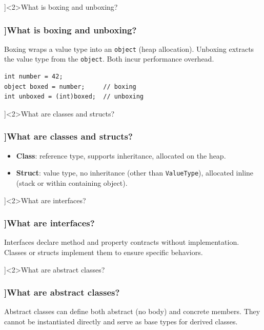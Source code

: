 \QuestionSlide[\CategoryBadge[MemoryColor!20]{Types \& Memory}]<2>{What is boxing and unboxing?}
\begin{frame}[fragile]
  \frametitle{\AnswerTitle[\CategoryBadge[MemoryColor!20]{Types \& Memory}]{What is boxing and unboxing?}}

  {\footnotesize
    Boxing wraps a value type into an \texttt{object} (heap allocation). Unboxing extracts the value type from the \texttt{object}. Both incur performance overhead.
  }

  \begin{verbatim}
int number = 42;
object boxed = number;     // boxing
int unboxed = (int)boxed;  // unboxing
  \end{verbatim}
\end{frame}

\QuestionSlide[\CategoryBadge[OOPColor!20]{Language Basics}]<2>{What are classes and structs?}
\begin{frame}[fragile]
  \frametitle{\AnswerTitle[\CategoryBadge[OOPColor!20]{Language Basics}]{What are classes and structs?}}

  {\footnotesize
    \begin{itemize}
      \item \textbf{Class}: reference type, supports inheritance, allocated on the heap.
      \item \textbf{Struct}: value type, no inheritance (other than \texttt{ValueType}), allocated inline (stack or within containing object).
    \end{itemize}
  }
\end{frame}

\QuestionSlide[\CategoryBadge[OOPColor!20]{Language Basics}]<2>{What are interfaces?}
\begin{frame}[fragile]
  \frametitle{\AnswerTitle[\CategoryBadge[OOPColor!20]{Language Basics}]{What are interfaces?}}

  {\footnotesize
    Interfaces declare method and property contracts without implementation. Classes or structs implement them to ensure specific behaviors.
  }
\end{frame}

\QuestionSlide[\CategoryBadge[OOPColor!20]{Language Basics}]<2>{What are abstract classes?}
\begin{frame}[fragile]
  \frametitle{\AnswerTitle[\CategoryBadge[OOPColor!20]{Language Basics}]{What are abstract classes?}}

  {\footnotesize
    Abstract classes can define both abstract (no body) and concrete members. They cannot be instantiated directly and serve as base types for derived classes.
  }
\end{frame}

